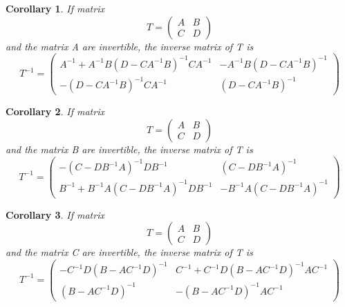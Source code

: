 \documentclass{article}
\newtheorem{corollary}{Corollary}
\begin{document}
    \begin{corollary}
        If matrix
        $$
            T =
            \begin{pmatrix}
                A & B \\
                C & D
            \end{pmatrix}
        $$
        and the matrix A are invertible, the inverse matrix of T is
        $$
            T^{-1} =
            \begin{pmatrix}
                A^{-1} + A^{-1} B (D - C A^{-1} B)^{-1} C A^{-1} & -A^{-1} B (D - C A^{-1} B)^{-1} \\
                -(D - C A^{-1} B)^{-1} C A^{-1} & (D - C A^{-1} B)^{-1}
            \end{pmatrix}
        $$
    \end{corollary}

    \begin{corollary}
        If matrix
        $$
            T =
            \begin{pmatrix}
                A & B \\
                C & D
            \end{pmatrix}
        $$
        and the matrix B are invertible, the inverse matrix of T is
        $$
            T^{-1} =
            \begin{pmatrix}
                -(C - D B^{-1} A)^{-1} D B^{-1} & (C - D B^{-1} A)^{-1} \\
                B^{-1} + B^{-1} A (C - D B^{-1} A)^{-1} D B^{-1} & -B^{-1} A (C - D B^{-1} A)^{-1}
            \end{pmatrix}
        $$
    \end{corollary}

    \begin{corollary}
         If matrix
        $$
            T =
            \begin{pmatrix}
                A & B \\
                C & D
            \end{pmatrix}
        $$
        and the matrix C are invertible, the inverse matrix of T is
        $$
            T^{-1} =
            \begin{pmatrix}
                -C^{-1} D (B - A C^{-1} D)^{-1} & C^{-1} + C^{-1} D (B - A C^{-1} D)^{-1} A C^{-1} \\
                (B - A C^{-1} D)^{-1} & -(B - A C^{-1} D)^{-1} A C^{-1}
            \end{pmatrix}
        $$
    \end{corollary}
\end{document}
